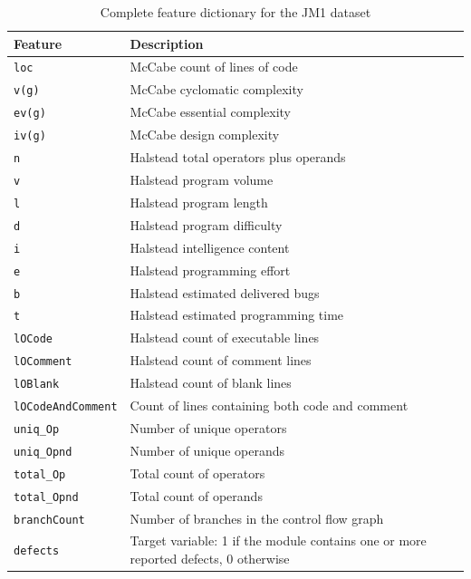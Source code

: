 \documentclass[12pt,a4paper,oneside]{report}
\newcommand{\tabfont}{\fontsize{11}{13}\selectfont\setlength{\tabcolsep}{4pt}}
\begin{document}
\begin{table}[H]
\centering
\caption{Complete feature dictionary for the JM1 dataset}
\label{tab:dict}
\tabfont
\begin{tabular}{L{34mm}L{96mm}}
\toprule
\textbf{Feature} & \textbf{Description} \\
\midrule
\texttt{loc}              & McCabe count of lines of code \\
\texttt{v(g)}             & McCabe cyclomatic complexity \\
\texttt{ev(g)}            & McCabe essential complexity \\
\texttt{iv(g)}            & McCabe design complexity \\
\texttt{n}                & Halstead total operators plus operands \\
\texttt{v}                & Halstead program volume \\
\texttt{l}                & Halstead program length \\
\texttt{d}                & Halstead program difficulty \\
\texttt{i}                & Halstead intelligence content \\
\texttt{e}                & Halstead programming effort \\
\texttt{b}                & Halstead estimated delivered bugs \\
\texttt{t}                & Halstead estimated programming time \\
\texttt{lOCode}           & Halstead count of executable lines \\
\texttt{lOComment}        & Halstead count of comment lines \\
\texttt{lOBlank}          & Halstead count of blank lines \\
\texttt{lOCodeAndComment} & Count of lines containing both code and comment \\
\texttt{uniq\_Op}         & Number of unique operators \\
\texttt{uniq\_Opnd}       & Number of unique operands \\
\texttt{total\_Op}        & Total count of operators \\
\texttt{total\_Opnd}      & Total count of operands \\
\texttt{branchCount}      & Number of branches in the control flow graph \\
\midrule
\texttt{defects}          & Target variable: 1 if the module contains one or more reported defects, 0 otherwise \\
\bottomrule
\end{tabular}
\end{table}
\end{document}
